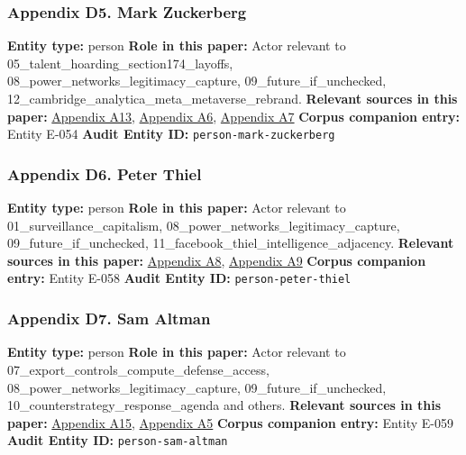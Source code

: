 \documentclass[
  american,
  11pt,
  letterpaper,
]{article}
\begin{document}
\subsubsection{Appendix D5. Mark
Zuckerberg}\label{ch-09-appendix-d5-mark-zuckerberg}

\textbf{Entity type:} person \textbf{Role in this paper:} Actor relevant
to 05\_talent\_hoarding\_section174\_layoffs,
08\_power\_networks\_legitimacy\_capture, 09\_future\_if\_unchecked,
12\_cambridge\_analytica\_meta\_metaverse\_rebrand. \textbf{Relevant
sources in this paper:}
\hyperref[ch-09-appendix-a13-mark-zuckerberg-s-message-to-meta-employees]{Appendix
A13},
\hyperref[ch-09-appendix-a6-inside-mark-zuckerbergs-top-secret-hawaii-compound]{Appendix
A6},
\hyperref[ch-09-appendix-a7-mark-zuckerberg-downplays-his-5-000-square-foot-underground-bunker-in-hawaii-just-a-little-shelter]{Appendix
A7} \textbf{Corpus companion entry:} Entity E-054 \textbf{Audit Entity
ID:} \texttt{person-mark-zuckerberg}

\subsubsection{Appendix D6. Peter
Thiel}\label{ch-09-appendix-d6-peter-thiel}

\textbf{Entity type:} person \textbf{Role in this paper:} Actor relevant
to 01\_surveillance\_capitalism,
08\_power\_networks\_legitimacy\_capture, 09\_future\_if\_unchecked,
11\_facebook\_thiel\_intelligence\_adjacency. \textbf{Relevant sources
in this paper:}
\hyperref[ch-09-appendix-a8-why-silicon-valley-billionaires-are-prepping-for-the-apocalypse-in-new-zealand]{Appendix
A8},
\hyperref[ch-09-appendix-a9-new-zealand-woos-the-wealthy-with-golden-visa-changes]{Appendix
A9} \textbf{Corpus companion entry:} Entity E-058 \textbf{Audit Entity
ID:} \texttt{person-peter-thiel}

\subsubsection{Appendix D7. Sam
Altman}\label{ch-09-appendix-d7-sam-altman}

\textbf{Entity type:} person \textbf{Role in this paper:} Actor relevant
to 07\_export\_controls\_compute\_defense\_access,
08\_power\_networks\_legitimacy\_capture, 09\_future\_if\_unchecked,
10\_counterstrategy\_response\_agenda and others. \textbf{Relevant
sources in this paper:}
\hyperref[ch-09-appendix-a15-openais-proposals-for-the-us-ai-action-plan]{Appendix
A15},
\hyperref[ch-09-appendix-a5-sam-altman-s-manifest-destiny]{Appendix A5}
\textbf{Corpus companion entry:} Entity E-059 \textbf{Audit Entity ID:}
\texttt{person-sam-altman}
\end{document}

